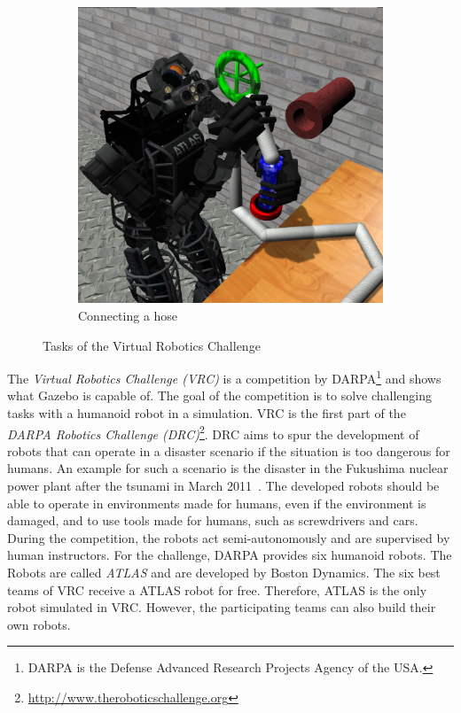 \begin{figure}
\begin{subfigure}[b]{0.3\textwidth}
    \label{fig:vrc_walking}
  \end{subfigure}
  \begin{subfigure}[b]{0.3\textwidth}
    \includegraphics[width=\textwidth]{pics/darpa_hose}
    \caption{Connecting a hose}
    \label{fig:vrc_hose}
  \end{subfigure}
  \caption[Tasks of the Virtual Robotics Challenge]{Tasks of the Virtual Robotics Challenge~\cite{vrc_pics}}
  \label{fig:vrc}
\end{figure}
The \textit{Virtual Robotics Challenge (VRC)} is a competition by DARPA\footnote{DARPA is the Defense Advanced Research Projects Agency of the USA.} and shows what Gazebo is capable of. The goal of the competition is to solve challenging tasks with a humanoid robot in a simulation. VRC is the first part of the \textit{DARPA Robotics Challenge (DRC)}\footnote{\url{http://www.theroboticschallenge.org}}. DRC aims to spur the development of robots that can operate in a disaster scenario if the situation is too dangerous for humans. An example for such a scenario is the disaster in the Fukushima nuclear power plant after the tsunami in March 2011~\cite{fukushima}. The developed robots should be able to operate in environments made for humans, even if the environment is damaged, and to use tools made for humans, such as screwdrivers and cars. During the competition, the robots act semi-autonomously and are supervised by human instructors. For the challenge, DARPA provides six humanoid robots. The Robots are called \textit{ATLAS} and are developed by Boston Dynamics. The six best teams of VRC receive a ATLAS robot for free. Therefore, ATLAS is the only robot simulated in VRC. However, the participating teams can also build their own robots.
